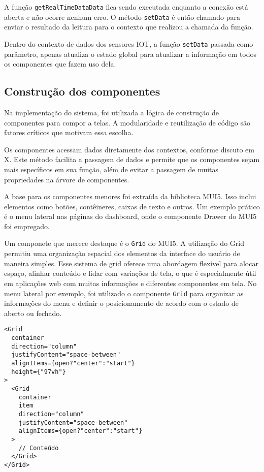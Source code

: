 A função \texttt{getRealTimeDataData} fica sendo executada enquanto a conexão está aberta e não ocorre nenhum erro. O método \texttt{setData} é então chamado para enviar o resultado da leitura para o contexto que realizou a chamada da função.

Dentro do contexto de dados dos sensores IOT, a função \texttt{setData} passada como parâmetro, apenas atualiza o estado global para atualizar a informação em todos os componentes que fazem uso dela.

\subsection{Construção dos componentes}\label{subsec:componentization}

Na implementação do sistema, foi utilizada a lógica de construção de componentes para compor a telas. A modularidade e reutilização de código são fatores críticos que motivam essa escolha. 

Os componentes acessam dados diretamente dos contextos, conforme discuto em X. Este método facilita a passagem de dados e permite que os componentes sejam mais específicos em sua função, além de evitar a passagem de muitas propriedades na árvore de componentes.


A base para os componentes menores foi extraída da biblioteca \gls{MUI5}. Isso inclui elementos como botões, contêineres, caixas de texto e outros. Um exemplo prático é o menu lateral nas páginas do dashboard, onde o componente Drawer do \gls{MUI5} foi empregado. 

Um componete que merece destaque é o \texttt{Grid} do \gls{MUI5}. A utilização do Grid permitiu uma organização espacial dos elementos da interface do usuário de maneira simples. Esse sistema de grid oferece uma abordagem flexível para alocar espaço, alinhar conteúdo e lidar com variações de tela, o que é especialmente útil em aplicações web com muitas informações e diferentes componentes em tela. No menu lateral por exemplo, foi utilizado o componente \texttt{Grid} para organizar as informações do menu e definir o posicionamento de acordo com o estado de aberto ou fechado.

\begin{verbatim}
<Grid 
  container
  direction="column"
  justifyContent="space-between"
  alignItems={open?"center":"start"}
  height={"97vh"}
>
  <Grid 
    container
    item
    direction="column"
    justifyContent="space-between"
    alignItems={open?"center":"start"}
  >
    // Conteúdo
  </Grid>
</Grid>
\end{verbatim}

